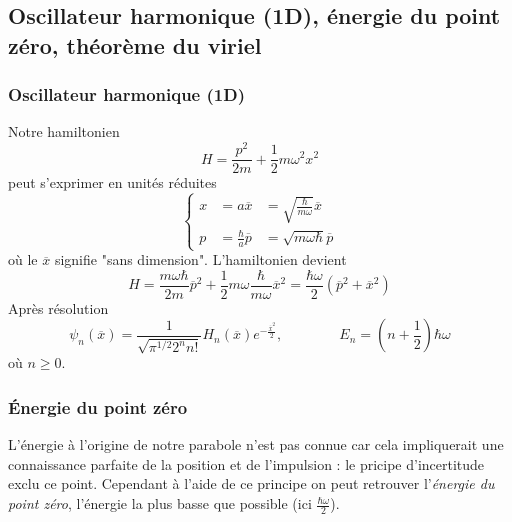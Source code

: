 		

	\subsection{Oscillateur harmonique (1D), énergie du point zéro, théorème du viriel}
		\subsubsection{Oscillateur harmonique (1D)}	
		Notre hamiltonien
		\begin{equation}
		H = \frac{p^2}{2m}+\frac{1}{2}m\omega^2x^2
		\end{equation}
		peut s'exprimer en unités réduites
		\begin{equation}
		\left\{\begin{array}{lll}
		x &= a\overline{x} &= \sqrt{\frac{\hbar}{m\omega}}\overline{x}\\
		p &= \frac{\hbar}{a}\overline{p} &= \sqrt{m\omega\hbar}\overline{p}
		\end{array}\right.
		\end{equation}
		où le $\overline{x}$ signifie "sans dimension". L’hamiltonien devient
		\begin{equation}
		H = \frac{m\omega\hbar}{2m}\overline{p}^2+\frac{1}{2}m\omega\frac{\hbar}{m\omega}\overline{x}^2
		= \frac{\hbar\omega}{2}(\overline{p}^2+\overline{x}^2)
		\end{equation}
		Après résolution
		\begin{equation}
		\psi_n(\overline{x}) = \dfrac{1}{\sqrt{\pi^{1/2}2^nn!}}H_n(\overline{x})e^{-\frac{\overline{x}^2}{2}},
		\qquad\qquad E_n = \left(n+\frac{1}{2}\right)\hbar\omega
		\end{equation}
		où $n\geq0$.
		
		
		\subsubsection{Énergie du point zéro}		
		L'énergie à l'origine de notre parabole n'est pas connue car cela impliquerait une connaissance 
		parfaite de la position et de l'impulsion : le pricipe d'incertitude exclu ce point. Cependant 
		à l'aide de ce principe on peut retrouver l'\textit{énergie du point zéro}, l'énergie la plus 
		basse que possible (ici $\frac{\hbar\omega}{2}$).\\
		
